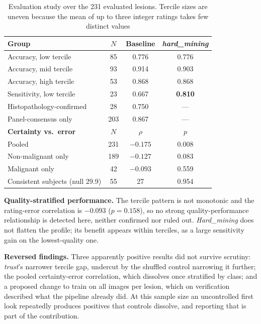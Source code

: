 \documentclass[conference]{IEEEtran}
\begin{document}
\begin{table}[htbp]
\caption{Evaluation study over the 231 evaluated lesions. Tercile sizes are uneven because the mean of up to three integer ratings takes few distinct values}
\label{tab:evalstudy}
\centering
\scriptsize
\setlength{\tabcolsep}{3pt}
\begin{tabular}{|l|c|c|c|}
\hline
\textbf{Group} & \textbf{$N$} & \textbf{Baseline} & \textbf{\emph{hard\_mining}} \\
\hline
Accuracy, low tercile & 85 & 0.776 & 0.776 \\
Accuracy, mid tercile & 93 & 0.914 & 0.903 \\
Accuracy, high tercile & 53 & 0.868 & 0.868 \\
Sensitivity, low tercile & 23 & 0.667 & \textbf{0.810} \\
\hline
Histopathology-confirmed & 28 & 0.750 & --- \\
Panel-consensus only & 203 & 0.867 & --- \\
\hline
\textbf{Certainty vs.\ error} & \textbf{$N$} & \textbf{$\rho$} & \textbf{$p$} \\
\hline
Pooled & 231 & $-0.175$ & 0.008 \\
Non-malignant only & 189 & $-0.127$ & 0.083 \\
Malignant only & 42 & $-0.093$ & 0.559 \\
Consistent subjects (null 29.9) & 55 & 27 & 0.954 \\
\hline
\end{tabular}
\end{table}

\textbf{Quality-stratified performance.} The tercile pattern is not monotonic and the rating-error correlation is $-0.093$ ($p=0.158$), so no strong quality-performance relationship is detected here, neither confirmed nor ruled out. \emph{Hard\_mining} does not flatten the profile; its benefit appears within terciles, as a large sensitivity gain on the lowest-quality one.

\textbf{Reversed findings.} Three apparently positive results did not survive scrutiny: \emph{trust}'s narrower tercile gap, undercut by the shuffled control narrowing it further; the pooled certainty-error correlation, which dissolves once stratified by class; and a proposed change to train on all images per lesion, which on verification described what the pipeline already did. At this sample size an uncontrolled first look repeatedly produces positives that controls dissolve, and reporting that is part of the contribution.
\end{document}
